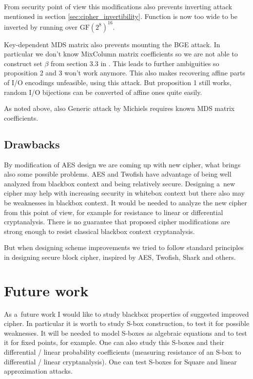 \documentclass[11pt,oneside,final]{fithesis2}
\newcommand{\gfe}{\ensuremath{\text{GF}\left(2^8\right)}}
\begin{document}
    From security point of view this modifications also prevents inverting attack mentioned in section \ref{sec:cipher_invertibility}. Function is now too wide to be
    inverted by running over $\gfe^{16}$. 
    
    Key-dependent MDS matrix also prevents mounting the BGE attack. In particular we don't know MixColumn matrix coefficients so we are not able to construct set $\beta$
    from section 3.3 in \cite{Billet:2004:CWB:2080787.2080809}. This leads to further ambiguities so proposition 2 and 3 won't work anymore. This also makes recovering 
    affine parts of I/O encodings unfeasible, using this attack. But proposition 1 still works, random I/O bijections can be converted of affine ones quite easily.

    As noted above, also  Generic attack by Michiels \citep{Michiels:2007:MST:1314276.1314291} requires known MDS matrix coefficients.
    
    \section{Drawbacks}
    By modification of AES design we are coming up with new cipher, what brings also some possible problems. AES and Twofish have advantage of being well analyzed from blackbox 
    context and being relatively secure. Designing a~new cipher may help with increasing security in whitebox context but there also may be weaknesses in blackbox context. 
    It would be needed to analyze the new cipher from this point of view, for example for resistance to linear or differential cryptanalysis. There is no guarantee that 
    proposed cipher modifications are strong enough to resist classical blackbox context cryptanalysis.
    
    But when designing scheme improvements we tried to follow standard principles in designing secure block cipher, inspired by AES, Twofish, Shark and others.
    
    
\chapter{Future work}\label{sec:futurework}
    As a~future work I would like to study blackbox properties of suggested improved cipher. In particular it is worth to study S-box construction, to test
    it for possible weaknesses. It will be needed to model S-boxes as algebraic equations and to test it for fixed points, for example. One can also study this S-boxes
    and their differential / linear probability coefficients (measuring resistance of an S-box to differential / linear cryptanalysis). One can test S-boxes 
    for Square and linear approximation attacks. 
    
\end{document}
